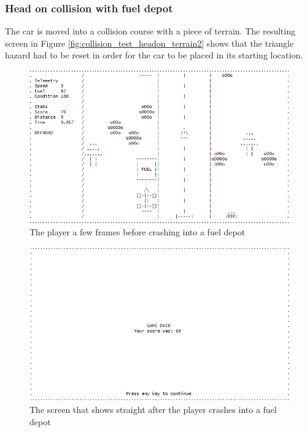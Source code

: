 \documentclass{article}
\begin{document}
\subsubsection*{Head on collision with fuel depot}
The car is moved into a collision course with a piece of terrain. The resulting screen in Figure \ref{fig:collision_test_headon_terrain2} shows that the triangle hazard had to be reset in order for the car to be placed in its starting location.
\begin{figure}[!ht]
	\begin{center}
	\includegraphics[width=0.63\paperwidth]{images/collision_test_headon_depot}
	\caption{The player a few frames before crashing into a fuel depot}
	\label{fig:collision_test_headon_depot} 
	\end{center}
\end{figure}
\begin{figure}[!ht]
	\begin{center}
	\includegraphics[width=0.63\paperwidth]{images/collision_test_headon_depot2}
	\caption{The screen that shows straight after the player crashes into a fuel depot}
	\label{fig:collision_test_headon_depot2} 
	\end{center}
\end{figure}
\newpage
\end{document}
